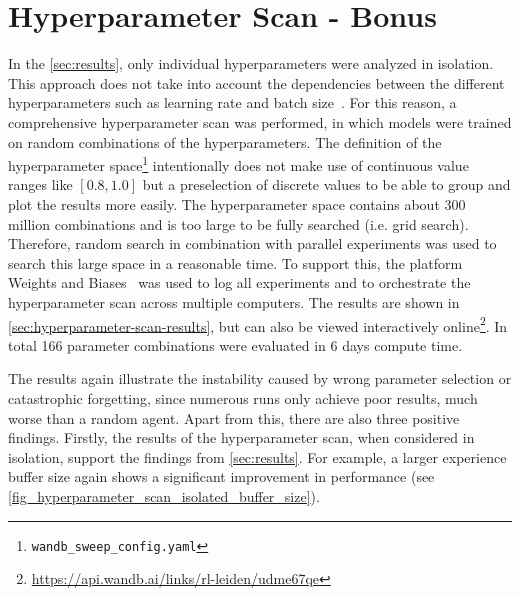 \documentclass{article}
\begin{document}

\section{Hyperparameter Scan - Bonus}
\label{sec:bonus}
In the \autoref{sec:results}, only individual hyperparameters were analyzed in isolation.
This approach does not take into account the dependencies between the different hyperparameters 
such as learning rate and batch size~\cite{DBLP:conf/iclr/SmithKYL18}.
For this reason, a comprehensive hyperparameter scan was performed, in which models were trained on random combinations of the hyperparameters. 
The definition of the hyperparameter space\footnote{\texttt{wandb\_sweep\_config.yaml}} 
intentionally does not make use of continuous value ranges like $[0.8, 1.0]$ but a preselection of discrete values to be able to group and plot the results more easily.
The hyperparameter space contains about 300 million combinations and is too large to be fully searched (i.e. grid search). 
Therefore, random search in combination with parallel experiments was used to search this large space in a reasonable time.
To support this, the platform Weights and Biases~\cite{wandb} was used to log all experiments and to orchestrate the hyperparameter scan across multiple computers.
The results are shown in \autoref{sec:hyperparameter-scan-results},
but can also be viewed interactively online\footnote{\url{https://api.wandb.ai/links/rl-leiden/udme67qe}}. 
In total 166 parameter combinations were evaluated in 6 days compute time.

The results again illustrate the instability caused by wrong parameter selection or catastrophic forgetting, 
since numerous runs only achieve poor results, much worse than a random agent. 
Apart from this, there are also three positive findings.
Firstly, the results of the hyperparameter scan, when considered in isolation, 
support the findings from \autoref{sec:results}. 
For example, a larger experience buffer size again shows a significant improvement in performance (see \autoref{fig_hyperparameter_scan_isolated_buffer_size}). 

\nocite{DBLP:books/sp/Plaat22}
\end{document}
